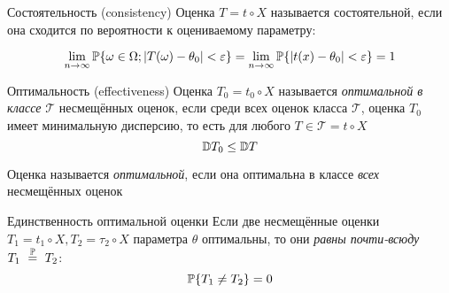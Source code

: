 \begin{dfn}{Состоятельность (consistency)}
Оценка $T = t\circ X$ называется состоятельной,
если она сходится по вероятности к оцениваемому параметру:

$$\lim_{n\to\infty}
    \mathbb P\{\omega\in\Omega; \left|T(\omega) - \theta_0\right| < \varepsilon \}
= \lim_{n\to\infty}
    \mathbb P\{\left|t(x) - \theta_0\right| < \varepsilon\}
= 1$$
\end{dfn}

\begin{dfn}{Оптимальность (effectiveness)}
Оценка $T_0 = t_0\circ X$ называется \emph{оптимальной в классе} $\mathcal T$ несмещённых оценок,
если среди всех оценок класса $\mathcal T$,
оценка $T_0$ имеет минимальную дисперсию,
то есть для любого $T\in\mathcal T = t\circ X$
$$\mathbb D T_0 \leq \mathbb D T$$

Оценка называется \emph{оптимальной},
если она оптимальна в классе \emph{всех} несмещённых оценок
\end{dfn}

\begin{thm}{Единственность оптимальной оценки}
Если две несмещённые оценки $T_1 = t_1\circ X, T_2 = \tau_2\circ X$ параметра $\theta$ оптимальны,
то они \emph{равны почти-всюду} $T_1~\overset{\mathbb P}{=}~T_2$:
  $$\mathbb P\{T_1\neq T_2\} = 0$$
\end{thm}
